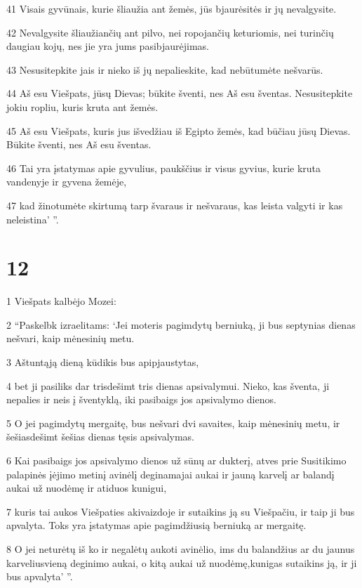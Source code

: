 \par 41 Visais gyvūnais, kurie šliaužia ant žemės, jūs bjaurėsitės ir jų nevalgysite. 
\par 42 Nevalgysite šliaužiančių ant pilvo, nei ropojančių keturiomis, nei turinčių daugiau kojų, nes jie yra jums pasibjaurėjimas. 
\par 43 Nesusitepkite jais ir nieko iš jų nepalieskite, kad nebūtumėte nešvarūs. 
\par 44 Aš esu Viešpats, jūsų Dievas; būkite šventi, nes Aš esu šventas. Nesusitepkite jokiu ropliu, kuris kruta ant žemės. 
\par 45 Aš esu Viešpats, kuris jus išvedžiau iš Egipto žemės, kad būčiau jūsų Dievas. Būkite šventi, nes Aš esu šventas. 
\par 46 Tai yra įstatymas apie gyvulius, paukščius ir visus gyvius, kurie kruta vandenyje ir gyvena žemėje, 
\par 47 kad žinotumėte skirtumą tarp švaraus ir nešvaraus, kas leista valgyti ir kas neleistina’ ”.



\chapter{12}


\par 1 Viešpats kalbėjo Mozei: 
\par 2 “Paskelbk izraelitams: ‘Jei moteris pagimdytų berniuką, ji bus septynias dienas nešvari, kaip mėnesinių metu. 
\par 3 Aštuntąją dieną kūdikis bus apipjaustytas, 
\par 4 bet ji pasiliks dar trisdešimt tris dienas apsivalymui. Nieko, kas šventa, ji nepalies ir neis į šventyklą, iki pasibaigs jos apsivalymo dienos. 
\par 5 O jei pagimdytų mergaitę, bus nešvari dvi savaites, kaip mėnesinių metu, ir šešiasdešimt šešias dienas tęsis apsivalymas. 
\par 6 Kai pasibaigs jos apsivalymo dienos už sūnų ar dukterį, atves prie Susitikimo palapinės įėjimo metinį avinėlį deginamajai aukai ir jauną karvelį ar balandį aukai už nuodėmę ir atiduos kunigui, 
\par 7 kuris tai aukos Viešpaties akivaizdoje ir sutaikins ją su Viešpačiu, ir taip ji bus apvalyta. Toks yra įstatymas apie pagimdžiusią berniuką ar mergaitę. 
\par 8 O jei neturėtų iš ko ir negalėtų aukoti avinėlio, ims du balandžius ar du jaunus karvelius­vieną deginimo aukai, o kitą aukai už nuodėmę,­kunigas sutaikins ją, ir ji bus apvalyta’ ”.



